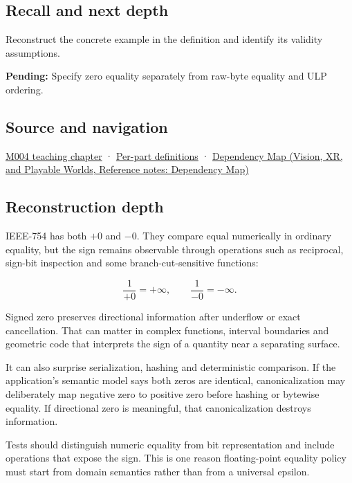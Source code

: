 \subsection{Recall and next depth}\label{appendix-3a048f032c1f-recall-and-next-depth}

\hypertarget{appendix-3a048f032c1f-recall-and-next-depth}{}

Reconstruct the concrete example in the definition and identify its validity assumptions.

\textbf{Pending:} Specify zero equality separately from raw-byte equality and ULP ordering.

\subsection{Source and navigation}\label{appendix-3a048f032c1f-source-and-navigation}

\hypertarget{appendix-3a048f032c1f-source-and-navigation}{}

\hyperref[01-foundations-i-ch001-a-stretching-ruler-for-real-valued-quantities]{M004 teaching chapter} · \hyperref[appendix-fd090d982a15-m004---parts-61-76]{Per-part definitions} · \href{../07-Vision-XR-and-Playable-Worlds/main.pdf\#nameddest=appendix-4ad47bdd269a}{Dependency Map (Vision, XR, and Playable Worlds, Reference notes: Dependency Map)}

\subsection{Reconstruction depth}\label{appendix-3a048f032c1f-reconstruction-depth}

\hypertarget{appendix-3a048f032c1f-reconstruction-depth}{}

IEEE-754 has both \(+0\) and \(-0\). They compare equal numerically in ordinary equality, but the sign remains observable through operations such as reciprocal, sign-bit inspection and some branch-cut-sensitive functions:

\[
\frac{1}{+0}=+\infty,
\qquad
\frac{1}{-0}=-\infty.
\]

Signed zero preserves directional information after underflow or exact cancellation. That can matter in complex functions, interval boundaries and geometric code that interprets the sign of a quantity near a separating surface.

It can also surprise serialization, hashing and deterministic comparison. If the application's semantic model says both zeros are identical, canonicalization may deliberately map negative zero to positive zero before hashing or bytewise equality. If directional zero is meaningful, that canonicalization destroys information.

Tests should distinguish numeric equality from bit representation and include operations that expose the sign. This is one reason floating-point equality policy must start from domain semantics rather than from a universal epsilon.
